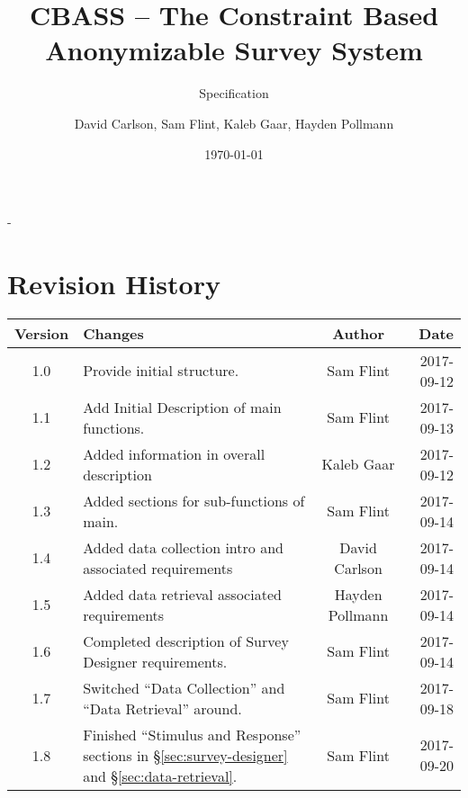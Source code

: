 \documentclass[10pt,letter]{report}
\title{CBASS -- The Constraint Based Anonymizable Survey System}
\subtitle{Specification}
\author{David Carlson, Sam Flint, Kaleb Gaar, Hayden Pollmann}
\date{\today}
\begin{document}
\maketitle
-
\chapter*{Revision History}
\label{sec:revisions}


\begin{table}[h]
  \centering
  \begin{tabularx}{\textwidth}{c|X|c|r}
    \textbf{Version}   & \textbf{Changes}                                                                                           & \textbf{Author}         & \textbf{Date} \\
    \hline\hline
    1.0                & Provide initial structure.                                                                                 & Sam Flint               & 2017-09-12    \\
    1.1                & Add Initial Description of main functions.                                                                 & Sam Flint               & 2017-09-13    \\
    1.2                & Added information in overall description                                                                   & Kaleb Gaar              & 2017-09-12    \\
    1.3                & Added sections for sub-functions of main.                                                                  & Sam Flint               & 2017-09-14    \\
    1.4                & Added data collection intro and associated requirements                                                    & David Carlson           & 2017-09-14    \\
    1.5                & Added data retrieval associated requirements                                                               & Hayden Pollmann         & 2017-09-14    \\
    1.6                & Completed description of Survey Designer requirements.                                                     & Sam Flint               & 2017-09-14    \\
    1.7                & Switched ``Data Collection'' and ``Data Retrieval'' around.                                                & Sam Flint               & 2017-09-18    \\
    1.8                & Finished ``Stimulus and Response'' sections in \S\ref{sec:survey-designer} and \S\ref{sec:data-retrieval}. & Sam Flint               & 2017-09-20    \\

\end{tabularx}
\end{table}
\end{document}
